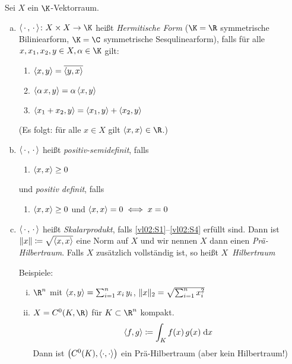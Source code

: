\begin{thEmpty}[Skalarprodukt]
    Sei $X$ ein $\K$-Vektorraum.
    \begin{enumerate}[a)]
        \item
            $\emptySP\colon X\times X \to \K$ heißt \emph{Hermitische Form}
            ($\K=\R$ symmetrische Biliniearform, $\K=\C$ symmetrische
            Sesqulinearform), falls für alle $x,x_1,x_2,y\in X,\alpha\in\K$ gilt:
            \begin{enumerate}[({S}1),leftmargin=2cm]
                \item\label{vl02:S1}
                    $\SP{x,y} = \conj{\SP{y,x}}$
                \item\label{vl02:S2}
                    $\SP{\alpha\,x,y} = \alpha\,\SP{x,y}$
                \item\label{vl02:S3}
                    $\SP{x_1+x_2,y} = \SP{x_1,y} + \SP{x_2,y}$
            \end{enumerate}
            (Es folgt: für alle $x\in X$ gilt $\SP{x,x}\in\R$.)

        \item
            $\SP{\,\cdot\,,\,\cdot\,}$ heißt \emph{positiv-semidefinit}, falls
            \begin{enumerate}[({S}4'),leftmargin=2cm]
                \item\label{vl02:S4p}
                    $\SP{x,x} \geq 0$
            \end{enumerate}
            und \emph{positiv definit}, falls
            \begin{enumerate}[({S}4),leftmargin=2cm]
                \item\label{vl02:S4}
                    $\SP{x,x} \geq 0$ und $\SP{x,x}=0 \iff x=0$
            \end{enumerate}

        \item
            $\SP{\,\cdot\,,\,\cdot\,}$ heißt \emph{Skalarprodukt}, falls 
            \ref{vl02:S1}--\ref{vl02:S4} erfüllt sind.
            Dann ist $\norm{x}\defeq\sqrt{\SP{x,x}}$ eine Norm auf $X$ und wir
            nennen $X$ dann einen \emph{Prä-Hilbertraum}.
            Falls $X$ zusätzlich vollständig ist, so heißt $X$~\emph{Hilbertraum}

            Beispiele:
            \begin{enumerate}[i)]
                \item 
                    $\R^n$ mit $\SP{x,y} = \isum[1]^n x_i\,y_i$, 
                    $\norm{x}_2 = \sqrt{\isum[1]^n x_i^2}$
                \item
                    $X=C^0(K,\R)$ für $K\subset\R^n$ kompakt.
                    \[ \SP{f,g} \defeq \int_K f(x)\,g(x)\dif{x} \]
                    Dann ist $\bigl( C^0(K), \SP{\cdot,\cdot} \bigr)$ ein
                    Prä-Hilbertraum (aber kein Hilbertraum!)
            \end{enumerate}
    \end{enumerate}
\end{thEmpty}

